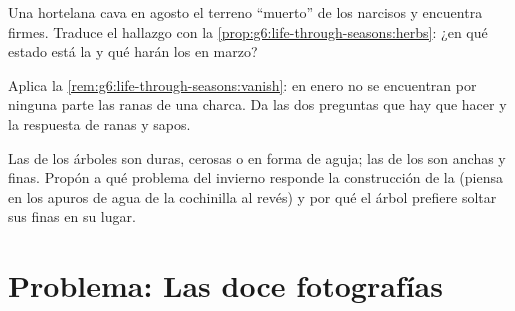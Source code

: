 \begin{exercise}[$\star\star$]\label{exo:g6:life-through-seasons:10}
Una hortelana cava en agosto el terreno ``muerto'' de los narcisos y
encuentra  firmes. Traduce el hallazgo con la
\cref{prop:g6:life-through-seasons:herbs}: ¿en qué estado está la
 y qué harán los  en marzo?
\end{exercise}

\begin{exercise}[$\star\star$]\label{exo:g6:life-through-seasons:11}
Aplica la \cref{rem:g6:life-through-seasons:vanish}: en enero no se
encuentran por ninguna parte las ranas de una charca. Da las dos
preguntas que hay que hacer y la respuesta de ranas y sapos.
\end{exercise}

\begin{exercise}[$\star\star\star$]\label{exo:g6:life-through-seasons:12}
Las  de los árboles  son duras, cerosas o en forma
de aguja; las de los  son anchas y finas. Propón a qué
problema del invierno responde la construcción de la 
(piensa en los apuros de agua de la cochinilla al revés) y por qué el
árbol  prefiere soltar sus  finas en su lugar.
\end{exercise}

\section{Problema: Las doce fotografías}

